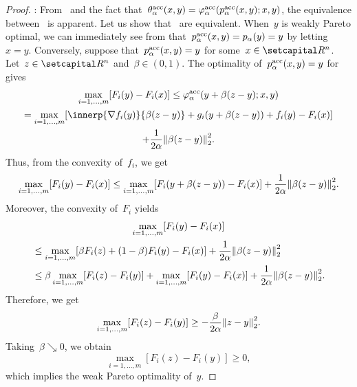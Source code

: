 \documentclass[../main]{subfiles}
\begin{document}
\begin{proof}
    : From~ and the fact that~$\theta^{\mathrm{acc}}_\alpha(x, y) = \varphi^{\mathrm{acc}}_\alpha(p^{\mathrm{acc}}_\alpha(x, y); x, y)$, the equivalence between~ is apparent.
    Let us show that~ are equivalent.
    When~$y$ is weakly Pareto optimal, we can immediately see from  that~$p^{\mathrm{acc}}_\alpha(x, y) = p_\alpha(y) = y$ by letting~$x = y$.
    Conversely, suppose that~$p^{\mathrm{acc}}_\alpha(x, y) = y$ for some~$x \in \setR^n$.
    Let~$z \in \setR^n$ and~$\beta \in (0, 1)$.
    The optimality of~$p^{\mathrm{acc}}_\alpha(x, y) = y$ for~ gives
    \begin{multline}
        \max_{i = 1, \dots, m} [ F_i(y) - F_i(x) ] \le \varphi^\acc_\alpha(y + \beta (z - y); x, y) \\
        = \max_{i = 1, \dots, m} [ \innerp{\nabla f_i(y)}{\beta (z - y)} + g_i(y + \beta (z - y)) + f_i(y) - F_i(x) ] \\
        + \frac{1}{2 \alpha} \norm*{\beta (z - y)}_2^2
    .\end{multline}
    Thus, from the convexity of~$f_i$, we get
    \begin{equation}
            \max_{i = 1, \dots, m}[ F_i(y) - F_i(x) ] \le \max_{i = 1, \dots, m}[ F_i(y + \beta (z - y)) - F_i(x) ] + \frac{1}{2 \alpha} \norm*{\beta (z - y)}_2^2
    .\end{equation}
    Moreover, the convexity of~$F_i$ yields
    \begin{multline}
        \max_{i = 1, \dots, m}[ F_i(y) - F_i(x) ] \\
        \begin{split}
        &\le \max_{i = 1, \dots, m}[ \beta F_i(z) + (1 - \beta) F_i(y) - F_i(x) ] + \frac{1}{2 \alpha} \norm*{\beta (z - y) }_2^2 \\
        &\le \beta \max_{i = 1, \dots, m}[  F_i(z) - F_i(y) ] + \max_{i = 1, \dots, m}[ F_i(y) - F_i(x) ] + \frac{1}{2 \alpha} \norm*{\beta (z - y) }_2^2
        .\end{split}
    \end{multline}
    Therefore, we get
    \begin{equation}
        \max_{i = 1, \dots, m}[  F_i(z) - F_i(y)  ] \ge - \frac{\beta}{2 \alpha} \norm*{z - y }_2^2
    .\end{equation}
    Taking~$\beta \searrow 0$, we obtain
    \begin{equation}
        \max_{i = 1, \dots, m}[  F_i(z) - F_i(y)  ] \ge 0
    ,\end{equation}
    which implies the weak Pareto optimality of~$y$.


\end{proof}
\end{document}
